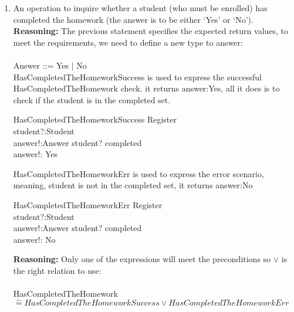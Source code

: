 \documentclass{article}
\newcommand{\estimates}{\mathrel{\hat{=}}}
\begin{document}
\begin{enumerate}
\begin{schema}{RegisterHomeworkCompletion}
  \Delta Register \\
  student?:Student
  \where
  student? \in enrolled \\
  completed' = completed \union $\{student?\}$ \\
  enrolled' = enrolled
  \end{schema} 
\item An operation to inquire whether a student (who must be enrolled) has completed the homework (the answer is to be either `Yes' or `No'). \\
  \textbf{Reasoning:} The previous statement specifies the expected return values, to meet the requirements, we need to define a new type to answer: \\
  \\
  Answer ::= Yes $\mid$ No \\
  HasCompletedTheHomeworkSuccess is used to express the successful HasCompletedTheHomework check. it returns answer:Yes, all it does is to check if the student is in the completed set. \\
  \begin{schema}{HasCompletedTheHomeworkSuccess}
  \Xi Register \\
  student?:Student \\
  answer!:Answer 
  \where
  student? \in completed \\
  answer!: Yes
  \end{schema}
  HasCompletedTheHomeworkErr is used to express the error scenario, meaning, student is not in the completed set, it returns answer:No \\
  \begin{schema}{HasCompletedTheHomeworkErr}
  \Xi Register \\
  student?:Student \\
  answer!:Answer 
  \where
  student? \notin completed \\
  answer!: No
  \end{schema}
  \textbf{Reasoning:} Only one of the expressions will meet the preconditions so $\lor$ is the right relation to use: \\
  \\
  HasCompletedTheHomework $\estimates HasCompletedTheHomeworkSuccess \lor HasCompletedTheHomeworkErr $ \\
  

\end{enumerate}
\end{document}
